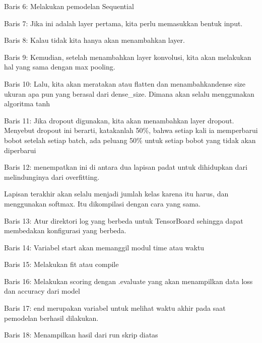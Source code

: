 \begin{enumerate}
\begin{itemize}
\par Baris 6:  Melakukan pemodelan Sequential
\par Baris 7: Jika ini adalah layer pertama, kita perlu memasukkan bentuk input.
\par Baris 8: Kalau tidak kita hanya akan menambahkan layer.
\par Baris 9: Kemudian, setelah menambahkan layer konvolusi, kita akan melakukan hal yang sama dengan max pooling.
\par Baris 10: Lalu, kita akan meratakan atau flatten dan menambahkandense size ukuran apa pun yang berasal dari dense\_size. Dimana akan selalu menggunakan algoritma tanh
\par Baris 11: Jika dropout digunakan, kita akan menambahkan layer dropout. Menyebut dropout ini berarti, katakanlah 50\%, bahwa setiap kali ia memperbarui bobot setelah setiap batch, ada peluang 50\% untuk setiap bobot yang tidak akan diperbarui
\par Baris 12: menempatkan ini di antara dua lapisan padat untuk dihidupkan dari melindunginya dari overfitting.
\par Lapisan terakhir akan selalu menjadi jumlah kelas karena itu harus, dan menggunakan softmax. Itu dikompilasi dengan cara yang sama.
\par Baris 13: Atur direktori log yang berbeda untuk TensorBoard sehingga dapat membedakan konfigurasi yang berbeda.
\par Baris 14: Variabel start akan memanggil modul time atau waktu
\par Baris 15: Melakukan fit atau compile 
\par Baris 16: Melakukan scoring dengan .evaluate yang akan menampilkan data loss dan accuracy dari model
\par Baris 17:  end merupakan variabel untuk melihat waktu akhir pada saat pemodelan berhasil dilakukan.
\par Baris 18:  Menampilkan hasil dari run skrip diatas 
\end{itemize}
\par


\end{enumerate}
